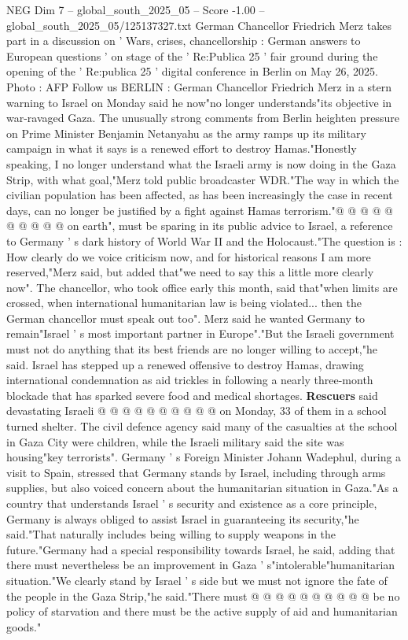 \begin{textsample}{NEG Dim 7 – global\_south\_2025\_05 – Score -1.00 – global\_south\_2025\_05/125137327.txt}  \label{ex:f7_neg_017}
German Chancellor Friedrich Merz takes part in a discussion on ' Wars, crises, chancellorship : German answers to European questions ' on stage of the ' Re:Publica 25 ' fair ground during the opening of the ' Re:publica 25 ' digital conference in Berlin on May 26, 2025.
Photo : AFP Follow us BERLIN : German Chancellor Friedrich Merz in a stern warning to Israel on Monday said he now"no longer understands"its objective in war-ravaged Gaza.
The unusually strong comments from Berlin heighten pressure on Prime Minister Benjamin Netanyahu as the army ramps up its military campaign in what it says is a renewed effort to destroy Hamas."Honestly speaking, I no longer understand what the Israeli army is now doing in the Gaza Strip, with what goal,"Merz told public broadcaster WDR."The way in which the civilian population has been affected, as has been increasingly the case in recent days, can no longer be justified by a fight against Hamas terrorism."@ @ @ @ @ @ @ @ @ @ on earth", must be sparing in its public advice to Israel, a reference to Germany ' s dark history of World War II and the Holocaust."The question is : How clearly do we voice criticism now, and for historical reasons I am more reserved,"Merz said, but added that"we need to say this a little more clearly now".
The chancellor, who took office early this month, said that"when limits are crossed, when international humanitarian law is being violated... then the German chancellor must speak out too".
Merz said he wanted Germany to remain"Israel ' s most important partner in Europe"."But the Israeli government must not do anything that its best friends are no longer willing to accept,"he said.
Israel has stepped up a renewed offensive to destroy Hamas, drawing international condemnation as aid trickles in following a nearly three-month blockade that has sparked severe food and medical shortages. \textbf{Rescuers} said devastating Israeli @ @ @ @ @ @ @ @ @ @ on Monday, 33 of them in a school turned shelter.
The civil defence agency said many of the casualties at the school in Gaza City were children, while the Israeli military said the site was housing"key terrorists".
Germany ' s Foreign Minister Johann Wadephul, during a visit to Spain, stressed that Germany stands by Israel, including through arms supplies, but also voiced concern about the humanitarian situation in Gaza."As a country that understands Israel ' s security and existence as a core principle, Germany is always obliged to assist Israel in guaranteeing its security,"he said."That naturally includes being willing to supply weapons in the future."Germany had a special responsibility towards Israel, he said, adding that there must nevertheless be an improvement in Gaza ' s"intolerable"humanitarian situation."We clearly stand by Israel ' s side but we must not ignore the fate of the people in the Gaza Strip,"he said."There must @ @ @ @ @ @ @ @ @ @ be no policy of starvation and there must be the active supply of aid and humanitarian goods."

\end{textsample}
